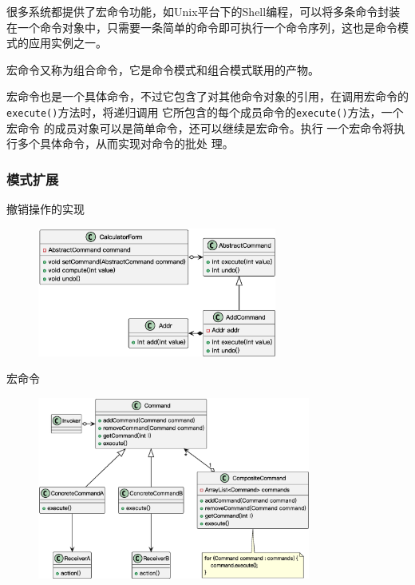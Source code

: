  很多系统都提供了宏命令功能，如Unix平台下的Shell编程，可以将多条命令封装在一个命令对象中，只需要一条简单的命令即可执行一个命令序列，这也是命令模式的应用实例之一。

\vspace{-0.5em}
\begin{shaded}
宏命令又称为组合命令，它是命令模式和组合模式联用的产物。

宏命令也是一个具体命令，不过它包含了对其他命令对象的引用，在调用宏命令的\;\verb|execute()|\;方法时，将递归调用 它所包含的每个成员命令的\;\verb|execute()|\;方法，一个宏命令 的成员对象可以是简单命令，还可以继续是宏命令。执行 一个宏命令将执行多个具体命令，从而实现对命令的批处 理。
\end{shaded}
\vspace{-1em}

\subsubsection{模式扩展}
撤销操作的实现
\begin{figure}[H]
    \vspace{-0.5em}
	\centering
	\includegraphics[width=0.7\textwidth]{images/命令模式拓展1.eps}
    \vspace{-1em}
\end{figure}

宏命令
\begin{figure}[H]
    \vspace{-0.5em}
	\centering
	\includegraphics[width=0.8\textwidth]{images/命令模式拓展2.eps}
    \vspace{-1em}
\end{figure}